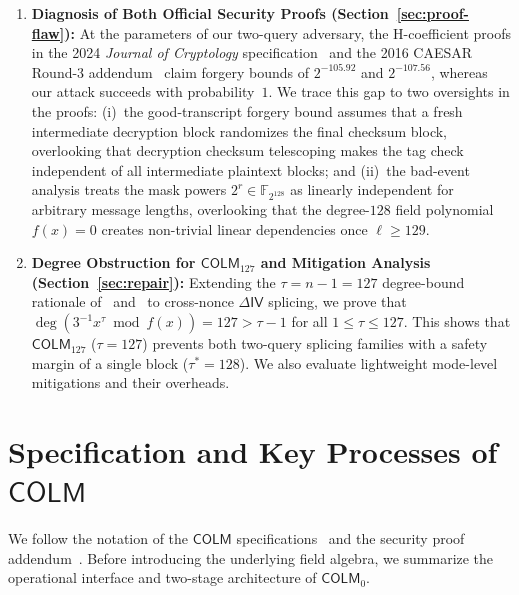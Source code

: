 \documentclass[11pt,a4paper]{article}
\theoremstyle{definition}
\theoremstyle{remark}
\newcommand{\FtwoN}{\mathbb{F}_{2^{128}}}
\newcommand{\COLM}{\mathsf{COLM}}
\newcommand{\COLMzero}{\mathsf{COLM}_0}
\newcommand{\COLMott}{\mathsf{COLM}_{127}}
\newcommand{\IV}{\mathsf{IV}}
\begin{document}
\begin{enumerate}[leftmargin=2em]
    \item \textbf{Diagnosis of Both Official Security Proofs (Section~\ref{sec:proof-flaw}):} At the parameters of our two-query adversary, the H-coefficient proofs in the 2024 \emph{Journal of Cryptology} specification~\cite{COLM24} and the 2016 CAESAR Round-3 addendum~\cite{COLMadd} claim forgery bounds of $2^{-105.92}$ and $2^{-107.56}$, whereas our attack succeeds with probability~$1$. We trace this gap to two oversights in the proofs: (i)~the good-transcript forgery bound assumes that a fresh intermediate decryption block randomizes the final checksum block, overlooking that decryption checksum telescoping makes the tag check independent of all intermediate plaintext blocks; and (ii)~the bad-event analysis treats the mask powers $2^r \in \FtwoN$ as linearly independent for arbitrary message lengths, overlooking that the degree-$128$ field polynomial $f(x) = 0$ creates non-trivial linear dependencies once $\ell \ge 129$.
    \item \textbf{Degree Obstruction for $\COLMott$ and Mitigation Analysis (Section~\ref{sec:repair}):} Extending the $\tau = n - 1 = 127$ degree-bound rationale of~\cite[Lemma~9]{DN14} and~\cite[Remark~1]{DLMN17} to cross-nonce $\Delta\IV$ splicing, we prove that $\deg(3^{-1}x^\tau \bmod f(x)) = 127 > \tau - 1$ for all $1 \le \tau \le 127$. This shows that $\COLMott$ ($\tau = 127$) prevents both two-query splicing families with a safety margin of a single block ($\tau^* = 128$). We also evaluate lightweight mode-level mitigations and their overheads.
\end{enumerate}

\section{Specification and Key Processes of \texorpdfstring{$\COLM$}{COLM}}
\label{sec:spec}

We follow the notation of the $\COLM$ specifications~\cite{COLMv1,COLM24} and the security proof addendum~\cite{COLMadd}. Before introducing the underlying field algebra, we summarize the operational interface and two-stage architecture of $\COLMzero$.
\end{document}
